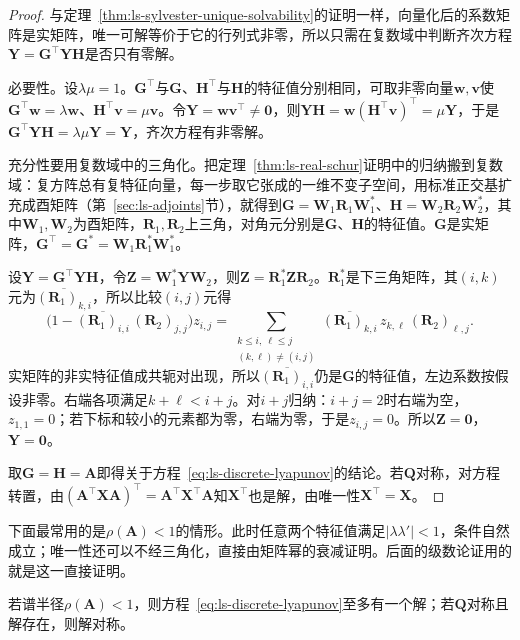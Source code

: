 \begin{proof}
与定理~\ref{thm:ls-sylvester-unique-solvability}的证明一样，向量化后的系数矩阵是实矩阵，唯一可解等价于它的行列式非零，所以只需在复数域中判断齐次方程$\bm Y=\bm G^\top\bm Y\bm H$是否只有零解。

必要性。设$\lambda\mu=1$。$\bm G^\top$与$\bm G$、$\bm H^\top$与$\bm H$的特征值分别相同，可取非零向量$\bm w,\bm v$使$\bm G^\top\bm w=\lambda\bm w$、$\bm H^\top\bm v=\mu\bm v$。令$\bm Y=\bm w\bm v^\top\neq\bm0$，则$\bm Y\bm H=\bm w(\bm H^\top\bm v)^\top=\mu\bm Y$，于是$\bm G^\top\bm Y\bm H=\lambda\mu\bm Y=\bm Y$，齐次方程有非零解。

充分性要用复数域中的三角化。把定理~\ref{thm:ls-real-schur}证明中的归纳搬到复数域：复方阵总有复特征向量，每一步取它张成的一维不变子空间，用标准正交基扩充成酉矩阵（第~\ref{sec:ls-adjoints}节），就得到$\bm G=\bm W_1\bm R_1\bm W_1^*$、$\bm H=\bm W_2\bm R_2\bm W_2^*$，其中$\bm W_1,\bm W_2$为酉矩阵，$\bm R_1,\bm R_2$上三角，对角元分别是$\bm G$、$\bm H$的特征值。$\bm G$是实矩阵，$\bm G^\top=\bm G^*=\bm W_1\bm R_1^*\bm W_1^*$。

设$\bm Y=\bm G^\top\bm Y\bm H$，令$\bm Z=\bm W_1^*\bm Y\bm W_2$，则$\bm Z=\bm R_1^*\bm Z\bm R_2$。$\bm R_1^*$是下三角矩阵，其$(i,k)$元为$\overline{(\bm R_1)_{k,i}}$，所以比较$(i,j)$元得
\[
 \bigl(1-\overline{(\bm R_1)_{i,i}}\,(\bm R_2)_{j,j}\bigr)z_{i,j}
 =\sum_{\substack{k\leq i,\ \ell\leq j\\(k,\ell)\neq(i,j)}}\overline{(\bm R_1)_{k,i}}\,z_{k,\ell}\,(\bm R_2)_{\ell,j}.
\]
实矩阵的非实特征值成共轭对出现，所以$\overline{(\bm R_1)_{i,i}}$仍是$\bm G$的特征值，左边系数按假设非零。右端各项满足$k+\ell<i+j$。对$i+j$归纳：$i+j=2$时右端为空，$z_{1,1}=0$；若下标和较小的元素都为零，右端为零，于是$z_{i,j}=0$。所以$\bm Z=\bm0$，$\bm Y=\bm0$。

取$\bm G=\bm H=\bm A$即得关于方程~\eqref{eq:ls-discrete-lyapunov}的结论。若$\bm Q$对称，对方程转置，由$(\bm A^\top\bm X\bm A)^\top=\bm A^\top\bm X^\top\bm A$知$\bm X^\top$也是解，由唯一性$\bm X^\top=\bm X$。
\end{proof}

下面最常用的是$\rho(\bm A)<1$的情形。此时任意两个特征值满足$|\lambda\lambda'|<1$，条件自然成立；唯一性还可以不经三角化，直接由矩阵幂的衰减证明。后面的级数论证用的就是这一直接证明。

\begin{lemma}[谱半径小于一时的唯一性]
\label{lem:ls-discrete-lyapunov-uniqueness}
若谱半径$\rho(\bm A)<1$，则方程~\eqref{eq:ls-discrete-lyapunov}至多有一个解；若$\bm Q$对称且解存在，则解对称。
\end{lemma}


